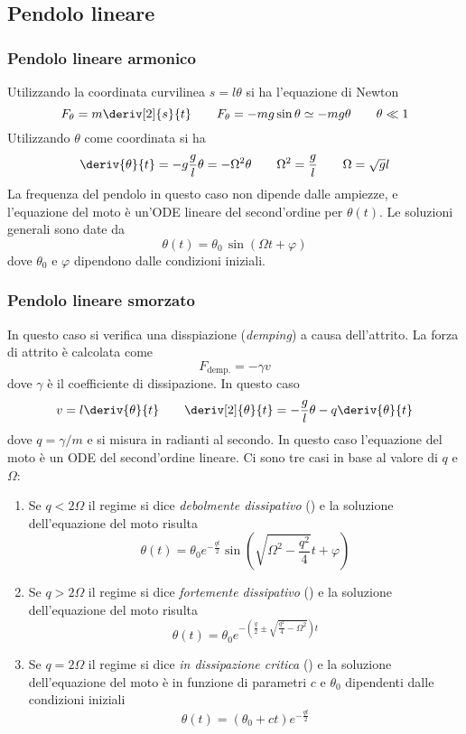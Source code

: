 \subsection{Pendolo lineare}

\subsubsection{Pendolo lineare armonico}
Utilizzando la coordinata curvilinea $s = l \theta$ si ha l'equazione di Newton
\[
F_{\theta} = m \deriv[2]{s}{t} \qquad F_\theta = - m g \sin\theta \simeq - m g \theta \qquad \theta \ll 1
\]
Utilizzando $\theta$ come coordinata si ha
\[
\deriv{\theta}{t} = - g \frac{g}{l} \theta = -\Omega^2 \theta \qquad \Omega^2 = \frac{g}{l} \qquad \Omega = \sqrt{g}{l}
\]
La frequenza del pendolo in questo caso non dipende dalle ampiezze, e l'equazione del moto è un'ODE lineare del second'ordine per $\theta(t)$. Le soluzioni generali sono date da
\[
\theta(t) = \theta_0 \, \sin(\Omega t + \varphi)
\]
dove $\theta_0$ e $\varphi$ dipendono dalle condizioni iniziali.

\subsubsection{Pendolo lineare smorzato}
In questo caso si verifica una disspiazione (\emph{demping}) a causa dell'attrito. La forza di attrito è calcolata come
\[
F_\text{demp.} = - \gamma v 
\]
dove $\gamma$ è il coefficiente di dissipazione. In questo caso
\[
v = l \deriv{\theta}{t} \qquad \deriv[2]{\theta}{t} = -\frac{g}{l} \theta - q \deriv{\theta}{t}
\]
dove $q = \gamma/m$ e si misura in radianti al secondo. In questo caso l'equazione del moto è un ODE del second'ordine lineare. Ci sono tre casi in base al valore di $q$ e $\Omega$:
\begin{enumerate}
\item Se $q < 2 \Omega$ il regime si dice \emph{debolmente dissipativo} () e la soluzione dell'equazione del moto risulta
\[
\theta(t) = \theta_0 e^{-\frac{qt}{2}} \sin\left(\sqrt{\Omega^2 - \frac{q^2}{4}} t + \varphi\right)
\]
\item Se $q > 2 \Omega$ il regime si dice \emph{fortemente dissipativo} () e la soluzione dell'equazione del moto risulta
\[
\theta(t) = \theta_0 e^{-\left(\frac{q}{2} \pm \sqrt{\frac{q^2}{4} - \Omega^2}\right) t}
\]
\item Se $q = 2 \Omega$ il regime si dice \emph{in dissipazione critica} () e la soluzione dell'equazione del moto è in funzione di parametri $c$ e $\theta_0$ dipendenti dalle condizioni iniziali
\[
\theta(t) = (\theta_0 + c t) e^{-\frac{qt}{2}}
\]
\end{enumerate}


